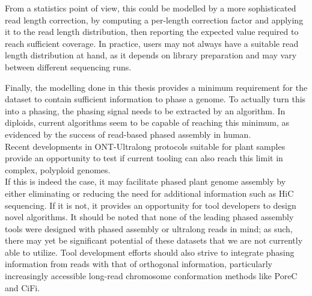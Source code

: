 From a statistics point of view, this could be modelled by a more sophisticated read length correction, by computing a per-length correction factor and applying it to the read length distribution, then reporting the expected value required to reach sufficient coverage.
In practice, users may not always have a suitable read length distribution at hand, as it depends on library preparation and may vary between different sequencing runs.

Finally, the modelling done in this thesis provides a minimum requirement for the dataset to contain sufficient information to phase a genome.
To actually turn this into a phasing, the phasing signal needs to be extracted by an algorithm.
In diploids, current algorithms seem to be capable of reaching this minimum, as evidenced by the success of read-based phased assembly in human\cite{sarashetti24, gross26}.\\
Recent developments in ONT-Ultralong protocols suitable for plant samples provide an opportunity to test if current tooling can also reach this limit in complex, polyploid genomes\cite{lu24}.
\\ %
If this is indeed the case, it may facilitate phased plant genome assembly by either eliminating or reducing the need for additional information such as HiC sequencing.
If it is not, it provides an opportunity for tool developers to design novel algorithms. %
It should be noted that none of the leading phased assembly tools were designed with phased assembly or ultralong reads in mind;
as such, there may yet be significant potential of these datasets that we are not currently able to utilize.
Tool development efforts should also strive to integrate phasing information from reads with that of orthogonal information, particularly increasingly accessible long-read chromosome conformation methods like PoreC and CiFi\cite{gross26, mcginty25, deshpande22}.

